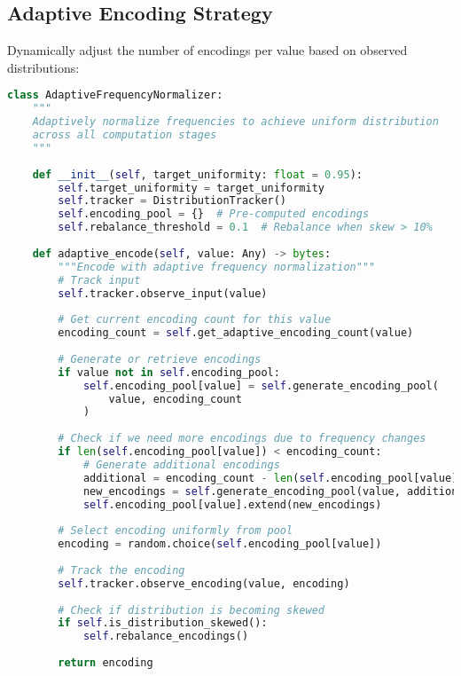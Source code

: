 \subsection{Adaptive Encoding Strategy}

Dynamically adjust the number of encodings per value based on observed distributions:

\begin{lstlisting}[language=Python, caption={Adaptive encoding based on frequency}]
class AdaptiveFrequencyNormalizer:
    """
    Adaptively normalize frequencies to achieve uniform distribution
    across all computation stages
    """
    
    def __init__(self, target_uniformity: float = 0.95):
        self.target_uniformity = target_uniformity
        self.tracker = DistributionTracker()
        self.encoding_pool = {}  # Pre-computed encodings
        self.rebalance_threshold = 0.1  # Rebalance when skew > 10%
        
    def adaptive_encode(self, value: Any) -> bytes:
        """Encode with adaptive frequency normalization"""
        # Track input
        self.tracker.observe_input(value)
        
        # Get current encoding count for this value
        encoding_count = self.get_adaptive_encoding_count(value)
        
        # Generate or retrieve encodings
        if value not in self.encoding_pool:
            self.encoding_pool[value] = self.generate_encoding_pool(
                value, encoding_count
            )
        
        # Check if we need more encodings due to frequency changes
        if len(self.encoding_pool[value]) < encoding_count:
            # Generate additional encodings
            additional = encoding_count - len(self.encoding_pool[value])
            new_encodings = self.generate_encoding_pool(value, additional)
            self.encoding_pool[value].extend(new_encodings)
        
        # Select encoding uniformly from pool
        encoding = random.choice(self.encoding_pool[value])
        
        # Track the encoding
        self.tracker.observe_encoding(value, encoding)
        
        # Check if distribution is becoming skewed
        if self.is_distribution_skewed():
            self.rebalance_encodings()
        
        return encoding
    

\end{lstlisting}

